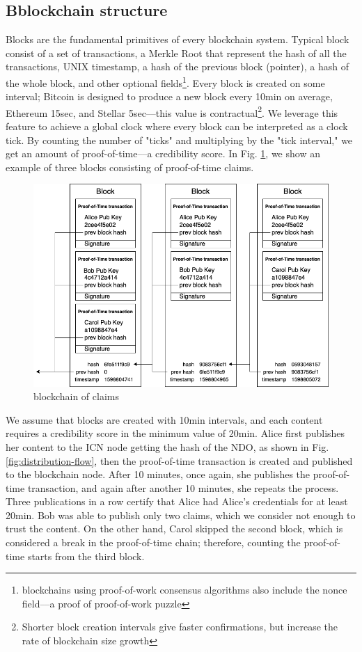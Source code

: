 \subsection{Bblockchain structure}
\label{blockchain-structure}
Blocks are the fundamental primitives of every blockchain system. Typical block consist of a set of transactions, a Merkle Root \cite{merkle1989certified} that represent the hash of all the transactions, UNIX timestamp, a hash of the previous block (pointer), a hash of the whole block, and other optional fields\footnote{blockchains using proof-of-work consensus algorithms also include the nonce field––a proof of proof-of-work puzzle}.
Every block is created on some interval; Bitcoin is designed to produce a new block every 10min on average, Ethereum 15sec, and Stellar 5sec––this value is contractual\footnote{Shorter block creation intervals give faster confirmations, but increase the rate of blockchain size growth}. We leverage this feature to achieve a global clock where every block can be interpreted as a clock tick. By counting the number of "ticks" and multiplying by the "tick interval," we get an amount of proof-of-time––a credibility score. In Fig. \ref{fig:blockchain-of-claims}, we show an example of three blocks consisting of proof-of-time claims.
\begin{figure}[h!]
\includegraphics[width=\textwidth]{img/blockchain_of_claims.png}
\centering
\caption{blockchain of claims}
\label{fig:blockchain-of-claims}
\end{figure} 
We assume that blocks are created with 10min intervals, and each content requires a credibility score in the minimum value of 20min. Alice first publishes her content to the ICN node getting the hash of the NDO, as shown in Fig. \ref{fig:distribution-flow}, then the proof-of-time transaction is created and published to the blockchain node. After 10 minutes, once again, she publishes the proof-of-time transaction, and again after another 10 minutes, she repeats the process. Three publications in a row certify that Alice had Alice's credentials for at least 20min. Bob was able to publish only two claims, which we consider not enough to trust the content. On the other hand, Carol skipped the second block, which is considered a break in the proof-of-time chain; therefore, counting the proof-of-time starts from the third block. 

